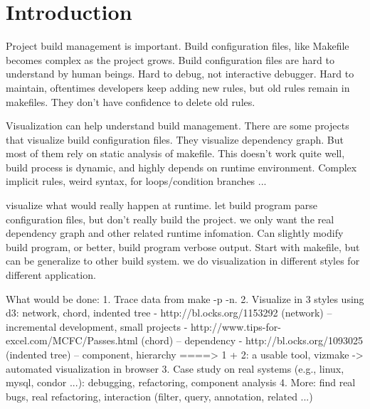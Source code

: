 \section{Introduction}

\cite{Tamrawi2012}

Project build management is important.
Build configuration files, like Makefile becomes complex as the project grows.
Build configuration files are hard to understand by human beings.
Hard to debug, not interactive debugger.
Hard to maintain, oftentimes developers keep adding new rules, but old rules
remain in makefiles. They don't have confidence to delete old rules.

Visualization can help understand build management. 
There are some projects that visualize build configuration files.
They visualize dependency graph.
But most of them rely on static analysis of makefile.
This doesn't work quite well, build process is dynamic, and highly depends on
runtime environment.
Complex implicit rules, weird syntax, for loops/condition branches ...

visualize what would really happen at runtime. 
let build program parse configuration files, but don't really build the project.
we only want the real dependency graph and other related runtime infomation.
Can slightly modify build program, or better, build program verbose output.
Start with makefile, but can be generalize to other build system.
we do visualization in different styles for different application.

What would be done:
1. Trace data from make -p -n. 
2. Visualize in 3 styles using d3: network, chord, indented tree
   - http://bl.ocks.org/1153292 (network) -- incremental development, small projects
   - http://www.tips-for-excel.com/MCFC/Passes.html (chord) -- dependency
   - http://bl.ocks.org/1093025 (indented tree) -- component, hierarchy
====> 1 + 2: a usable tool, vizmake -> automated visualization in browser
3. Case study on real systems (e.g., linux, mysql, condor ...): debugging,
   refactoring, component analysis
4. More: find real bugs, real refactoring, interaction (filter, query,
   annotation, related ...)
